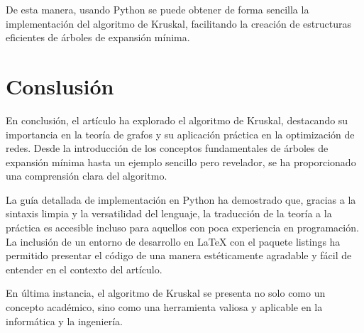 \documentclass[12pt,a4paper]{article}
\begin{document}
De esta manera, usando Python se puede obtener de forma sencilla la implementación del algoritmo de Kruskal, facilitando la creación de estructuras eficientes de árboles de expansión mínima.

\section{Conslusión}

En conclusión, el artículo ha explorado el algoritmo de Kruskal, destacando su importancia en la teoría de grafos y su aplicación práctica en la optimización de redes. Desde la introducción de los conceptos fundamentales de árboles de expansión mínima hasta un ejemplo sencillo pero revelador, se ha proporcionado una comprensión clara del algoritmo.

La guía detallada de implementación en Python ha demostrado que, gracias a la sintaxis limpia y la versatilidad del lenguaje, la traducción de la teoría a la práctica es accesible incluso para aquellos con poca experiencia en programación. La inclusión de un entorno de desarrollo en LaTeX con el paquete listings ha permitido presentar el código de una manera estéticamente agradable y fácil de entender en el contexto del artículo.

En última instancia, el algoritmo de Kruskal se presenta no solo como un concepto académico, sino como una herramienta valiosa y aplicable en la informática y la ingeniería.


\end{document}
